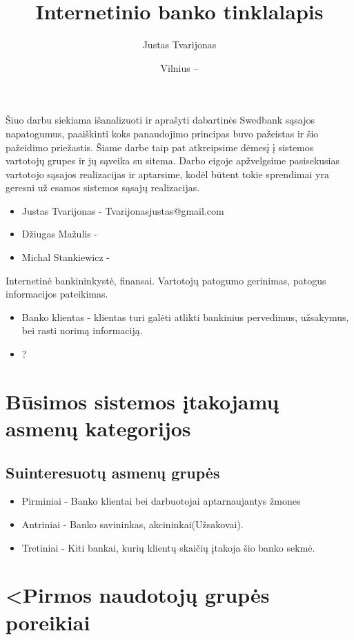 \documentclass{VUMIFPSkursinis}
\title{Internetinio banko tinklalapis}
\author{Justas Tvarijonas}
\date{Vilnius – \the\year}
\begin{document}
\maketitle

\tableofcontents
{}
Šiuo darbu siekiama išanalizuoti ir aprašyti dabartinės Swedbank sąsajos napatogumus, paaiškinti koks panaudojimo principas buvo pažeistas ir šio pažeidimo priežastis.
Šiame darbe taip pat atkreipsime dėmesį į sistemos vartotojų grupes ir jų sąveika su sitema.
Darbo eigoje apžvelgsime pasisekusias vartotojo sąsajos realizacijas ir aptarsime, kodėl būtent tokie sprendimai yra geresni už esamos sistemos sąsajų realizacijas.
\begin{itemize}
	\item Justas Tvarijonas - Tvarijonasjustas@gmail.com
	\item Džiugas Mažulis - 
	\item Michal Stankiewicz - 
\end{itemize}

	  Internetinė bankininkystė, finansai.
    Vartotojų patogumo gerinimas, patogus informacijos pateikimas.
		\begin{itemize}
      \item Banko klientas - klientas turi galėti atlikti bankinius pervedimus, užsakymus, bei rasti norimą informaciją.
      \item ?
		\end{itemize}
\section{Būsimos sistemos įtakojamų asmenų kategorijos}
  \subsection{Suinteresuotų asmenų grupės}
    \begin{itemize}
      \item Pirminiai - Banko klientai bei darbuotojai aptarnaujantys žmones
      \item Antriniai - Banko savininkas, akcininkai(Užsakovai).
      \item Tretiniai - Kiti bankai, kurių klientų skaičių įtakoja šio banko sekmė. 
    \end{itemize}
\section{<Pirmos naudotojų grupės poreikiai}
\end{document}
